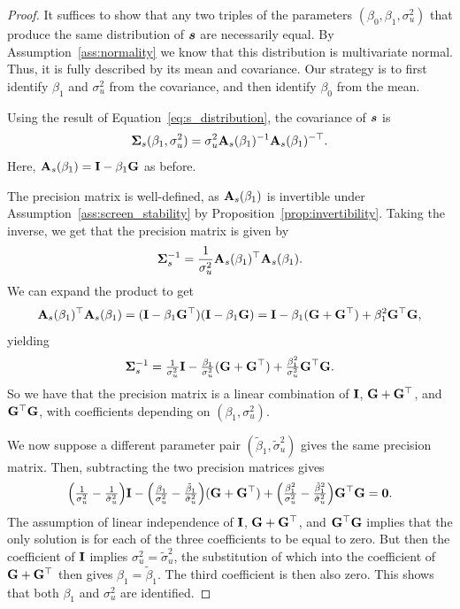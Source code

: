 \begin{proof}
It suffices to show that any two triples of the parameters $(\beta_0, \beta_1, \sigma_u^2)$ that produce the same distribution of $\bm{s}$ are necessarily equal. By Assumption~\ref{ass:normality} we know that this distribution is multivariate normal. Thus, it is fully described by its mean and covariance. Our strategy is to first identify $\beta_1$ and $\sigma_u^2$ from the covariance, and then identify $\beta_0$ from the mean.

Using the result of Equation~\eqref{eq:s_distribution}, the covariance of $\bm{s}$ is
\[
    \mathbf{\Sigma}_s(\beta_1, \sigma_u^2)
    = \sigma_u^2 \mathbf{A}_s(\beta_1)^{-1}\mathbf{A}_s(\beta_1)^{-\top}.
\]
Here, $\mathbf{A}_s(\beta_1) = \mathbf{I} - \beta_1\mathbf{G}$ as before.

The precision matrix is well-defined, as $\mathbf{A}_s(\beta_1)$ is invertible under Assumption~\ref{ass:screen_stability} by Proposition~\ref{prop:invertibility}. Taking the inverse, we get that the precision matrix is given by
\[
    \mathbf{\Sigma}_s^{-1}
    = \frac{1}{\sigma_u^2}\mathbf{A}_s(\beta_1)^\top\mathbf{A}_s(\beta_1).
\]
We can expand the product to get
\[
    \mathbf{A}_s(\beta_1)^\top\mathbf{A}_s(\beta_1)
    = (\mathbf{I} - \beta_1\mathbf{G}^\top)(\mathbf{I} - \beta_1\mathbf{G})
    = \mathbf{I} - \beta_1(\mathbf{G} + \mathbf{G}^\top) + \beta_1^2 \mathbf{G}^\top\mathbf{G},
\]
yielding
\[
    \mathbf{\Sigma}_s^{-1}
    = \tfrac{1}{\sigma_u^2}\mathbf{I}
    - \tfrac{\beta_1}{\sigma_u^2}(\mathbf{G} + \mathbf{G}^\top)
    + \tfrac{\beta_1^2}{\sigma_u^2}\mathbf{G}^\top\mathbf{G}.
\]
So we have that the precision matrix is a linear combination of $\mathbf{I}$, $\mathbf{G} + \mathbf{G}^\top$, and $\mathbf{G}^\top\mathbf{G}$, with coefficients depending on $(\beta_1, \sigma_u^2)$.

We now suppose a different parameter pair $(\tilde\beta_1, \tilde\sigma_u^2)$ gives the same precision matrix. Then, subtracting the two precision matrices gives
\[
    \Big(\tfrac{1}{\sigma_u^2} - \tfrac{1}{\tilde\sigma_u^2}\Big)\mathbf{I}
    - \Big(\tfrac{\beta_1}{\sigma_u^2} - \tfrac{\tilde\beta_1}{\tilde\sigma_u^2}\Big)(\mathbf{G} + \mathbf{G}^\top)
    + \Big(\tfrac{\beta_1^2}{\sigma_u^2} - \tfrac{\tilde\beta_1^2}{\tilde\sigma_u^2}\Big)\mathbf{G}^\top\mathbf{G}
    = \mathbf{0}.
\]
The assumption of linear independence of $\mathbf{I}$, $\mathbf{G} + \mathbf{G}^\top$, and $\mathbf{G}^\top\mathbf{G}$ implies that the only solution is for each of the three coefficients to be equal to zero. But then the coefficient of $\mathbf{I}$ implies $\sigma_u^2 = \tilde\sigma_u^2$, the substitution of which into the coefficient of $\mathbf{G} + \mathbf{G}^\top$ then gives $\beta_1 = \tilde\beta_1$. The third coefficient is then also zero. This shows that both $\beta_1$ and $\sigma_u^2$ are identified.


\end{proof}
